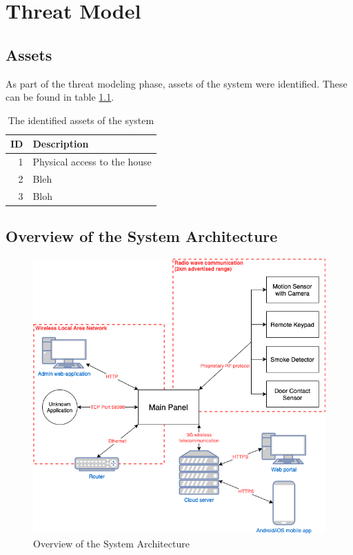 \chapter{Threat Model} \label{ch:threat-model}
\section{Assets}
As part of the threat modeling phase, assets of the system were identified. These can be found in table \ref{tb:assets}.
\begin{table}[!ht]
    \centering
    \begin{tabular}{r l}
        \hline
        \textbf{ID} & \textbf{Description} \\ \hline
        1  & Physical access to the house \\
        2  & Bleh \\
        3  & Bloh \\ \hline
    \end{tabular}
    \caption{The identified assets of the system}
    \label{tb:assets}
\end{table}

\section{Overview of the System Architecture}
\begin{figure}[!ht]
    \centering
    \includegraphics[width=\textwidth]{images/system-overview.png}
    \caption{Overview of the System Architecture}
    \label{fig:system-overview}
\end{figure}